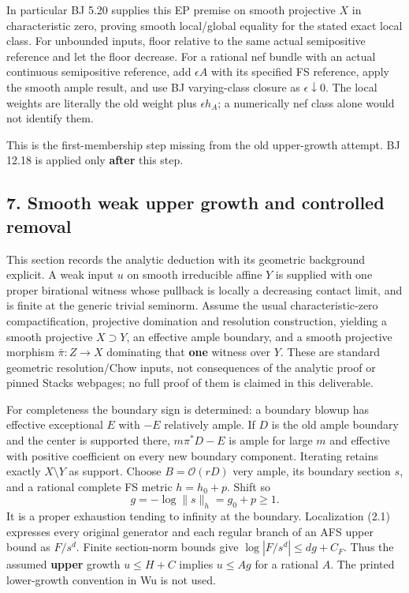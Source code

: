 \documentclass[
  10pt,
]{article}
\begin{document}
In particular BJ 5.20 supplies this EP premise on smooth projective
\(X\) in characteristic zero, proving smooth local/global equality for
the stated exact local class. For unbounded inputs, floor relative to
the same actual semipositive reference and let the floor decrease. For a
rational nef bundle with an actual continuous semipositive reference,
add \(\epsilon A\) with its specified FS reference, apply the smooth
ample result, and use BJ varying-class closure as
\(\epsilon\downarrow0\). The local weights are literally the old weight
plus \(\epsilon h_A\); a numerically nef class alone would not identify
them.

This is the first-membership step missing from the old upper-growth
attempt. BJ 12.18 is applied only \textbf{after} this step.

\subsection{7. Smooth weak upper growth and controlled
removal}\label{smooth-weak-upper-growth-and-controlled-removal}

This section records the analytic deduction with its geometric
background explicit. A weak input \(u\) on smooth irreducible affine
\(Y\) is supplied with one proper birational witness whose pullback is
locally a decreasing contact limit, and is finite at the generic trivial
seminorm. Assume the usual characteristic-zero compactification,
projective domination and resolution construction, yielding a smooth
projective \(X\supset Y\), an effective ample boundary, and a smooth
projective morphism \(\bar\pi:Z\to X\) dominating that \textbf{one}
witness over \(Y\). These are standard geometric resolution/Chow inputs,
not consequences of the analytic proof or pinned Stacks webpages; no
full proof of them is claimed in this deliverable.

For completeness the boundary sign is determined: a boundary blowup has
effective exceptional \(E\) with \(-E\) relatively ample. If \(D\) is
the old ample boundary and the center is supported there, \(m\pi^*D-E\)
is ample for large \(m\) and effective with positive coefficient on
every new boundary component. Iterating retains exactly \(X\setminus Y\)
as support. Choose \(B=\mathcal O(rD)\) very ample, its boundary section
\(s\), and a rational complete FS metric \(h=h_0+p\). Shift so
\[g=-\log\|s\|_h=g_0+p\ge1.\] It is a proper exhaustion tending to
infinity at the boundary. Localization (2.1) expresses every original
generator and each regular branch of an AFS upper bound as \(F/s^d\).
Finite section-norm bounds give \(\log|F/s^d|\le dg+C_F\). Thus the
assumed \textbf{upper} growth \(u\le H+C\) implies \(u\le Ag\) for a
rational \(A\). The printed lower-growth convention in Wu is not used.
\end{document}
